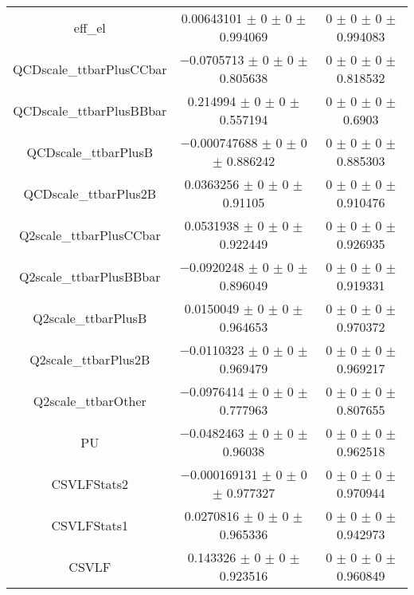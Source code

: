 \begin{table}
\begin{tabular}{ccc}
eff\_el & \num{0.00643101} $\pm$ \num{0} $\pm$ \num{0} $\pm$ \num{0.994069} & \num{0} $\pm$ \num{0} $\pm$ \num{0} $\pm$ \num{0.994083}\\
QCDscale\_ttbarPlusCCbar & \num{-0.0705713} $\pm$ \num{0} $\pm$ \num{0} $\pm$ \num{0.805638} & \num{0} $\pm$ \num{0} $\pm$ \num{0} $\pm$ \num{0.818532}\\
QCDscale\_ttbarPlusBBbar & \num{0.214994} $\pm$ \num{0} $\pm$ \num{0} $\pm$ \num{0.557194} & \num{0} $\pm$ \num{0} $\pm$ \num{0} $\pm$ \num{0.6903}\\
QCDscale\_ttbarPlusB & \num{-0.000747688} $\pm$ \num{0} $\pm$ \num{0} $\pm$ \num{0.886242} & \num{0} $\pm$ \num{0} $\pm$ \num{0} $\pm$ \num{0.885303}\\
QCDscale\_ttbarPlus2B & \num{0.0363256} $\pm$ \num{0} $\pm$ \num{0} $\pm$ \num{0.91105} & \num{0} $\pm$ \num{0} $\pm$ \num{0} $\pm$ \num{0.910476}\\
Q2scale\_ttbarPlusCCbar & \num{0.0531938} $\pm$ \num{0} $\pm$ \num{0} $\pm$ \num{0.922449} & \num{0} $\pm$ \num{0} $\pm$ \num{0} $\pm$ \num{0.926935}\\
Q2scale\_ttbarPlusBBbar & \num{-0.0920248} $\pm$ \num{0} $\pm$ \num{0} $\pm$ \num{0.896049} & \num{0} $\pm$ \num{0} $\pm$ \num{0} $\pm$ \num{0.919331}\\
Q2scale\_ttbarPlusB & \num{0.0150049} $\pm$ \num{0} $\pm$ \num{0} $\pm$ \num{0.964653} & \num{0} $\pm$ \num{0} $\pm$ \num{0} $\pm$ \num{0.970372}\\
Q2scale\_ttbarPlus2B & \num{-0.0110323} $\pm$ \num{0} $\pm$ \num{0} $\pm$ \num{0.969479} & \num{0} $\pm$ \num{0} $\pm$ \num{0} $\pm$ \num{0.969217}\\
Q2scale\_ttbarOther & \num{-0.0976414} $\pm$ \num{0} $\pm$ \num{0} $\pm$ \num{0.777963} & \num{0} $\pm$ \num{0} $\pm$ \num{0} $\pm$ \num{0.807655}\\
PU & \num{-0.0482463} $\pm$ \num{0} $\pm$ \num{0} $\pm$ \num{0.96038} & \num{0} $\pm$ \num{0} $\pm$ \num{0} $\pm$ \num{0.962518}\\
CSVLFStats2 & \num{-0.000169131} $\pm$ \num{0} $\pm$ \num{0} $\pm$ \num{0.977327} & \num{0} $\pm$ \num{0} $\pm$ \num{0} $\pm$ \num{0.970944}\\
CSVLFStats1 & \num{0.0270816} $\pm$ \num{0} $\pm$ \num{0} $\pm$ \num{0.965336} & \num{0} $\pm$ \num{0} $\pm$ \num{0} $\pm$ \num{0.942973}\\
CSVLF & \num{0.143326} $\pm$ \num{0} $\pm$ \num{0} $\pm$ \num{0.923516} & \num{0} $\pm$ \num{0} $\pm$ \num{0} $\pm$ \num{0.960849}\\

\end{tabular}
\end{table}
